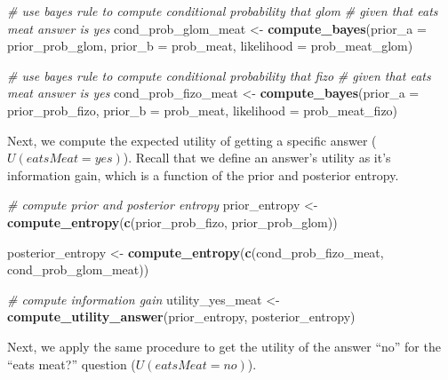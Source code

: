\documentclass[english,floatsintext,man]{apa6}
\newenvironment{Shaded}{\begin{snugshade}}{\end{snugshade}}
\newcommand{\KeywordTok}[1]{\textcolor[rgb]{0.13,0.29,0.53}{\textbf{#1}}}
\newcommand{\DataTypeTok}[1]{\textcolor[rgb]{0.13,0.29,0.53}{#1}}
\newcommand{\StringTok}[1]{\textcolor[rgb]{0.31,0.60,0.02}{#1}}
\newcommand{\CommentTok}[1]{\textcolor[rgb]{0.56,0.35,0.01}{\textit{#1}}}
\newcommand{\NormalTok}[1]{#1}
\theoremstyle{definition}
\theoremstyle{definition}
\theoremstyle{definition}
\theoremstyle{remark}
\begin{document}
\begin{Shaded}
\begin{Highlighting}[]
\CommentTok{# use bayes rule to compute conditional probability that glom }
\CommentTok{# given that eats meat answer is yes}
\NormalTok{cond_prob_glom_meat <-}\StringTok{ }\KeywordTok{compute_bayes}\NormalTok{(}\DataTypeTok{prior_a =}\NormalTok{ prior_prob_glom, }
                                     \DataTypeTok{prior_b =}\NormalTok{ prob_meat, }
                                     \DataTypeTok{likelihood =}\NormalTok{ prob_meat_glom)}

\CommentTok{# use bayes rule to compute conditional probability that fizo }
\CommentTok{# given that eats meat answer is yes}
\NormalTok{cond_prob_fizo_meat <-}\StringTok{ }\KeywordTok{compute_bayes}\NormalTok{(}\DataTypeTok{prior_a =}\NormalTok{ prior_prob_fizo, }
                                     \DataTypeTok{prior_b =}\NormalTok{ prob_meat, }
                                     \DataTypeTok{likelihood =}\NormalTok{ prob_meat_fizo)}
\end{Highlighting}
\end{Shaded}

\noindent
Next, we compute the expected utility of getting a specific answer
(\(U(eatsMeat = yes)\)). Recall that we define an answer's utility as
it's information gain, which is a function of the prior and posterior
entropy.

\begin{Shaded}
\begin{Highlighting}[]
\CommentTok{# compute prior and posterior entropy}
\NormalTok{prior_entropy <-}\StringTok{ }\KeywordTok{compute_entropy}\NormalTok{(}\KeywordTok{c}\NormalTok{(prior_prob_fizo, }
\NormalTok{                                   prior_prob_glom))}

\NormalTok{posterior_entropy <-}\StringTok{ }\KeywordTok{compute_entropy}\NormalTok{(}\KeywordTok{c}\NormalTok{(cond_prob_fizo_meat, }
\NormalTok{                                       cond_prob_glom_meat))}

\CommentTok{# compute information gain}
\NormalTok{utility_yes_meat <-}\StringTok{ }\KeywordTok{compute_utility_answer}\NormalTok{(prior_entropy, }
\NormalTok{                                           posterior_entropy)}
\end{Highlighting}
\end{Shaded}

\noindent
Next, we apply the same procedure to get the utility of the answer
\enquote{no} for the \enquote{eats meat?} question
(\(U(eatsMeat = no)\)).
\end{document}
